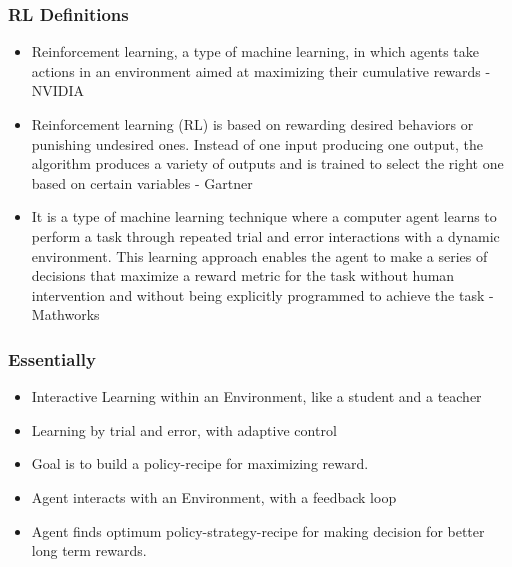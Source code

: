 \begin{frame}[fragile]\frametitle{RL Definitions}
\begin{itemize}
\item Reinforcement learning, a type of machine learning, in which agents take actions in an environment aimed at maximizing their cumulative rewards - NVIDIA

\item Reinforcement learning (RL) is based on rewarding desired behaviors or punishing undesired ones. Instead of one input producing one output, the algorithm produces a variety of outputs and is trained to select the right one based on certain variables - Gartner

\item It is a type of machine learning technique where a computer agent learns to perform a task through repeated trial and error interactions with a dynamic environment. This learning approach enables the agent to make a series of decisions that maximize a reward metric for the task without human intervention and without being explicitly programmed to achieve the task - Mathworks
\end{itemize}
\end{frame}

\begin{frame}[fragile]\frametitle{Essentially}
\begin{itemize}
\item Interactive Learning within an Environment, like a student and a teacher
\item Learning by trial and error, with adaptive control
\item Goal is to build a policy-recipe for maximizing reward.
\item Agent interacts with an Environment, with a feedback loop
\item Agent finds optimum policy-strategy-recipe for making decision for better long term rewards.
\end{itemize}
\end{frame}



